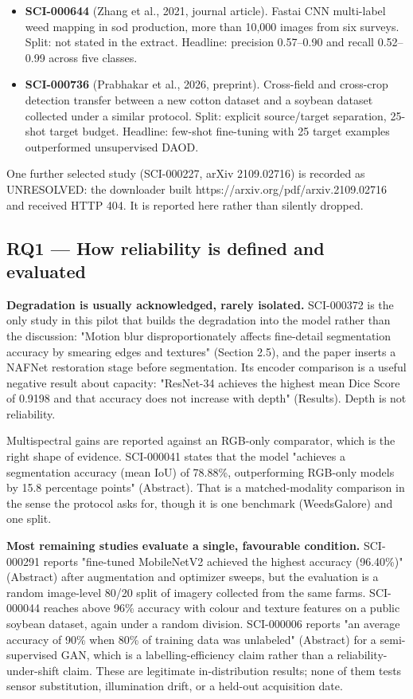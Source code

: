 \documentclass{article}
\begin{document}
\begin{itemize}
\item \textbf{SCI-000644} (Zhang et al., 2021, journal article). Fastai CNN multi-label weed
  mapping in sod production, more than 10,000 images from six surveys. Split: not stated
  in the extract. Headline: precision 0.57–0.90 and recall 0.52–0.99 across five
  classes.
\item \textbf{SCI-000736} (Prabhakar et al., 2026, preprint). Cross-field and cross-crop detection
  transfer between a new cotton dataset and a soybean dataset collected under a similar
  protocol. Split: explicit source/target separation, 25-shot target budget. Headline:
  few-shot fine-tuning with 25 target examples outperformed unsupervised DAOD.
\end{itemize}

One further selected study (SCI-000227, arXiv 2109.02716) is recorded as UNRESOLVED: the
downloader built https://arxiv.org/pdf/arxiv.2109.02716 and received HTTP 404. It is
reported here rather than silently dropped.

\subsection{RQ1 — How reliability is defined and evaluated}

\textbf{Degradation is usually acknowledged, rarely isolated.} SCI-000372 is the only
study in this pilot that builds the degradation into the model rather than the
discussion: "Motion blur disproportionately affects fine-detail segmentation
accuracy by smearing edges and textures" (Section 2.5), and the paper inserts a
NAFNet restoration stage before segmentation. Its encoder comparison is a useful
negative result about capacity: "ResNet-34 achieves the highest mean Dice Score of
0.9198 and that accuracy does not increase with depth" (Results). Depth is not
reliability.

\textit{}Multispectral gains are reported against an RGB-only comparator, which is the
right shape of evidence.\textit{} SCI-000041 states that the model "achieves a
segmentation accuracy (mean IoU) of 78.88\%, outperforming RGB-only models by 15.8
percentage points" (Abstract). That is a matched-modality comparison in the sense
the protocol asks for, though it is one benchmark (WeedsGalore) and one split.

\textbf{Most remaining studies evaluate a single, favourable condition.} SCI-000291
reports "fine-tuned MobileNetV2 achieved the highest accuracy (96.40\%)" (Abstract)
after augmentation and optimizer sweeps, but the evaluation is a random image-level
80/20 split of imagery collected from the same farms. SCI-000044 reaches above
96\% accuracy with colour and texture features on a public soybean dataset, again
under a random division. SCI-000006 reports "an average accuracy of 90\% when 80\%
of training data was unlabeled" (Abstract) for a semi-supervised GAN, which is a
labelling-efficiency claim rather than a reliability-under-shift claim. These are
legitimate in-distribution results; none of them tests sensor substitution,
illumination drift, or a held-out acquisition date.
\end{document}
